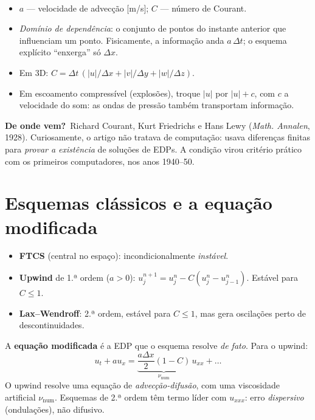 \documentclass[10pt,a4paper,twocolumn,openany]{report}
\newcommand{\lead}[2]{\par\medskip\noindent{\color{#1}\bfseries #2}\ }
\newenvironment{conceito}[1]{\section{#1}}{\par}
\newenvironment{dicionario}[1][Dicionário da equação]{\lead{azul}{#1.}\small}{\par\medskip}
\newcommand{\origem}{\par\smallskip\noindent\textcolor{azul}{\textbf{De onde vem?}}\ }
\begin{document}
\begin{dicionario}[Dicionário da equação: CFL]
\begin{itemize}[leftmargin=*,nosep]
  \item $a$ --- velocidade de advecção [m/s]; $C$ --- número de Courant.
  \item \emph{Domínio de dependência}: o conjunto de pontos do instante
        anterior que influenciam um ponto. Fisicamente, a informação anda
        $a\,\Delta t$; o esquema explícito ``enxerga'' só $\Delta x$.
  \item Em 3D: $C=\Delta t\,(|u|/\Delta x+|v|/\Delta y+|w|/\Delta z)$.
  \item Em escoamento compressível (explosões), troque $|u|$ por
        $|u|+c$, com $c$ a velocidade do som: as ondas de pressão também
        transportam informação.
\end{itemize}
\origem Richard Courant, Kurt Friedrichs e Hans Lewy (\emph{Math. Annalen},
1928). Curiosamente, o artigo não tratava de computação: usava diferenças
finitas para \emph{provar a existência} de soluções de EDPs. A condição
virou critério prático com os primeiros computadores, nos anos 1940--50.
\end{dicionario}


\begin{conceito}{Esquemas clássicos e a equação modificada}
\begin{itemize}
  \item \textbf{FTCS} (central no espaço): incondicionalmente \emph{instável}.
  \item \textbf{Upwind} de 1.ª ordem ($a>0$):
        $u_j^{n+1} = u_j^n - C(u_j^n - u_{j-1}^n)$. Estável para $C\le1$.
  \item \textbf{Lax--Wendroff}: 2.ª ordem, estável para $C\le1$, mas gera
        oscilações perto de descontinuidades.
\end{itemize}
A \textbf{equação modificada} é a EDP que o esquema resolve \emph{de fato}.
Para o upwind:
\[
  u_t + a u_x = \underbrace{\frac{a\Delta x}{2}(1-C)}_{\nu_{\text{num}}}\,u_{xx} + \ldots
\]
O upwind resolve uma equação de \emph{advecção-difusão}, com uma viscosidade
artificial $\nu_{\text{num}}$. Esquemas de 2.ª ordem têm termo líder com
$u_{xxx}$: erro \emph{dispersivo} (ondulações), não difusivo.
\end{conceito}
\end{document}
